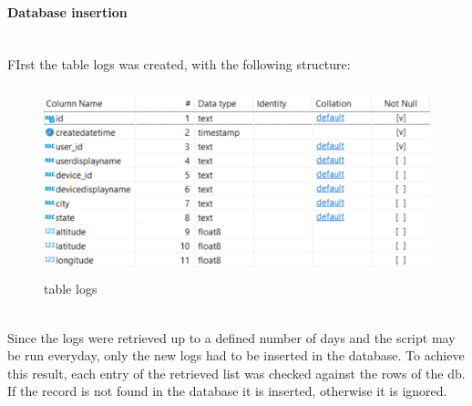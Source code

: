 \documentclass[12pt, a4paper, oneside]{article}
\begin{document}
\paragraph{Database insertion} ~\\
FIrst the table logs was created, with the following structure:
\begin{figure}[h]
    \centering
    \includegraphics[width=13cm, height=5.5cm]{table-logs.png}
    \caption{table logs}
\end{figure}\\
Since the logs were retrieved up to a defined number of days and the script may be run everyday, only the new logs had to be inserted in the database. To achieve this result, each entry of the retrieved list 
was checked against the rows of the db. If the record is not found in the database it is inserted, otherwise it is ignored.
\end{document}
